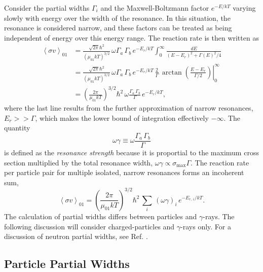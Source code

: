 Consider the partial widths $\Gamma_{i}$ and the Maxwell-Boltzmann factor $e^{-E/kT}$ varying slowly with energy over the width of the resonance. In this situation, the resonance is considered narrow, and these factors can be treated as being independent of energy over this energy range. The reaction rate is then written as
\begin{align}
\left\langle \sigma v \right\rangle_{01} &= \frac{\sqrt{2 \pi} \hbar^{2}}{\left(\mu_{01} k T\right)^{3/2}} \, \omega \Gamma_{a} \, \Gamma_{b} \, e^{-E_{r}/kT} \int_{0}^{\infty} \frac{dE}{\left(E - E_{r}\right)^{2} + \Gamma(E)^{2}/4} \nonumber \\
&= \frac{\sqrt{2 \pi} \hbar^{2}}{\left(\mu_{01} k T\right)^{3/2}} \, \omega \Gamma_{a} \, \Gamma_{b} \, e^{-E_{r}/kT} \, \frac{2}{\Gamma} \, \left. \arctan\left( \frac{E - E_{r}}{\Gamma/2} \right)\right|_{0}^{\infty} \nonumber \\
&= \left(\frac{2 \pi}{\mu_{01} k T}\right)^{3/2} \hbar^{2} \, \omega \frac{\Gamma_{a} \, \Gamma_{b}}{\Gamma} \, e^{-E_{r}/kT},
\end{align}
where the last line results from the further approximation of narrow resonances, $E_{r} >> \Gamma$, which makes the lower bound of integration effectively $-\infty$. The quantity
\begin{equation}
\omega \gamma \equiv \omega \frac{\Gamma_{a} \, \Gamma_{b}}{\Gamma}
\end{equation}
is defined as the \emph{resonance strength} because it is proportial to the maximum cross section multiplied by the total resonance width, $\omega \gamma \propto \sigma_{\mathrm{max}} \Gamma$. The reaction rate per particle pair for multiple isolated, narrow resonances forms an incoherent sum,
\begin{equation} \label{eqn:narrow_rate}
\left\langle \sigma v \right\rangle_{01} = \left(\frac{2 \pi}{\mu_{01} k T}\right)^{3/2} \hbar^{2} \, \sum_{i} \, (\omega \gamma)_{i} \, e^{-E_{r, \, i}/kT}.
\end{equation}
The calculation of partial widths differs between particles and $\gamma$-rays. The following discussion will consider charged-particles and $\gamma$-rays only. For a discussion of neutron partial widths, see Ref. \cite{Iliadis2015}.

\subsection{Particle Partial Widths} \label{subsec:particle_partial_widths}


